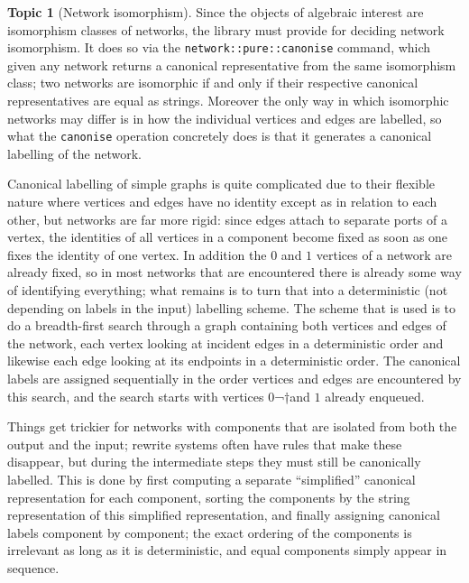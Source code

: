 \documentclass{article}
\theoremstyle{definition}
\newtheorem{topic}{Topic}
\begin{document}
\begin{topic}[Network isomorphism]
  Since the objects of algebraic interest are isomorphism classes of 
  networks, the library must provide for deciding network 
  isomorphism. It does so via the \texttt{network::pure::canonise} 
  command, which given any network returns a canonical representative 
  from the same isomorphism class; two networks are isomorphic if and 
  only if their respective canonical representatives are equal as 
  strings. Moreover the only way in which isomorphic networks may 
  differ is in how the individual vertices and edges are labelled, so 
  what the \texttt{canonise} operation concretely does is that it 
  generates a canonical labelling of the network.
  
  Canonical labelling of simple graphs is quite complicated due to 
  their flexible nature where vertices and edges have no identity 
  except as in relation to each other, but networks are far more rigid: 
  since edges attach to separate ports of a vertex, the identities of 
  all vertices in a component become fixed as soon as one fixes the 
  identity of one vertex. In addition the $0$ and $1$ vertices of a 
  network are already fixed, so in most networks that are encountered 
  there is already some way of identifying everything; what remains 
  is to turn that into a deterministic (not depending on labels in 
  the input) labelling scheme. The scheme 
  that is used is to do a breadth-first search through a graph 
  containing both vertices and edges of the network, each vertex 
  looking at incident edges in a deterministic order and likewise 
  each edge looking at its endpoints in a deterministic order. The 
  canonical labels are assigned sequentially in the order vertices 
  and edges are encountered by this search, and the search starts 
  with vertices $0$¬†and $1$ already enqueued. 
  
  Things get trickier for networks with components that are isolated 
  from both the output and the input; rewrite systems often have 
  rules that make these disappear, but during the intermediate steps 
  they must still be canonically labelled. This is done by first 
  computing a separate ``simplified'' canonical representation for 
  each component, sorting the components by the string representation 
  of this simplified representation, and finally assigning canonical 
  labels component by component; the exact ordering of the components 
  is irrelevant as long as it is deterministic, and equal components 
  simply appear in sequence.
  

\end{topic}
\end{document}
